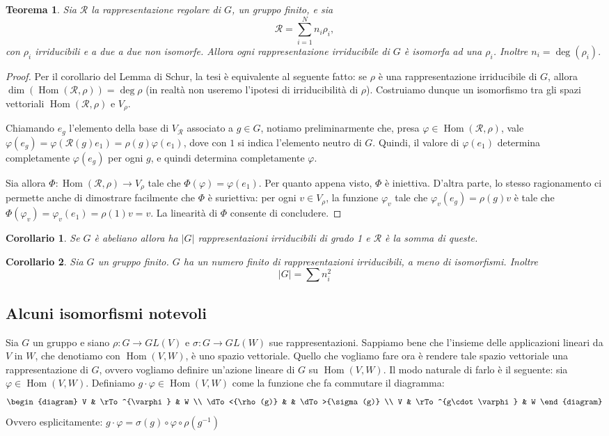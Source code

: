 \documentclass[11pt]{article}
\theoremstyle{plain}
\newtheorem{thm}{Teorema}[section]
\newtheorem*{cor}{Corollario}
\theoremstyle{definition}
\theoremstyle{remark}
\newcommand{\dsum}{\displaystyle\sum}
\DeclareMathOperator{\Hom}{Hom}
\newcommand{\quaddiag}[8]{
	\begin{diagram}
	#1     & \rTo^{#2} & #3 \\
	\dTo<{#6} &         & \dTo>{#4} \\
	#7     & \rTo^{#8} & #5
	\end{diagram}
}
\begin{document}
\begin{thm}
Sia $\mathcal{R}$ la rappresentazione regolare di $G$, un gruppo finito, e sia
\[ \mathcal{R} = \dsum_{i=1}^Nn_i \rho_i,\]
con $\rho_i$ irriducibili e a due a due non isomorfe. Allora ogni rappresentazione irriducibile di $G$ è isomorfa ad una $\rho_i$. Inoltre $n_i = \deg(\rho_i).$
\label{thm: teorema importantissimo}
\end{thm}
\begin{proof}
Per il corollario del Lemma di Schur, la tesi è equivalente al seguente fatto: se $\rho$ è una rappresentazione irriducibile di $G$, allora $\dim\left(\Hom(\mathcal{R},\rho)\right)=\deg\rho$ (in realtà non useremo l'ipotesi di irriducibilità di $\rho$). Costruiamo dunque un isomorfismo tra gli spazi vettoriali $\Hom(\mathcal{R},\rho)$ e $V_\rho$.

Chiamando $e_g$ l'elemento della base di $V_\mathcal{R}$ associato a $g\in G$, notiamo preliminarmente che, presa $\varphi\in\Hom(\mathcal{R},\rho)$, vale $\varphi(e_g)=\varphi(\mathcal{R}(g)e_{1})=\rho(g)\varphi(e_1)$, dove con $1$ si indica l'elemento neutro di $G$. Quindi, il valore di $\varphi(e_1)$ determina completamente $\varphi(e_g)$ per ogni $g$, e quindi determina completamente $\varphi$.

Sia allora $\Phi\colon\Hom(\mathcal{R},\rho)\to V_\rho$ tale che $\Phi(\varphi)=\varphi(e_{1})$. Per quanto appena visto, $\Phi$ è iniettiva. D'altra parte, lo stesso ragionamento ci permette anche di dimostrare facilmente che $\Phi$ è suriettiva: per ogni $v\in V_\rho$, la funzione $\varphi_v$ tale che $\varphi_v(e_g)=\rho(g)v$ è tale che $\Phi(\varphi_v)=\varphi_v(e_1)=\rho(1)v=v$. La linearità di $\Phi$ consente di concludere.
\end{proof}


\begin{cor}
Se $G$ è abeliano allora ha $|G|$ rappresentazioni irriducibili di grado 1 e $\mathcal{R}$ è la somma di queste.
\end{cor}


\begin{cor}
Sia $G$ un gruppo finito. $G$ ha un numero finito di rappresentazioni irriducibili, a meno di isomorfismi. Inoltre
\[|G| = \dsum n_i^2\]
\end{cor}






\newpage
\subsection{Alcuni isomorfismi notevoli}
Sia $G$ un gruppo e siano $\rho:G\to GL(V)$ e $\sigma:G\to GL(W)$ sue rappresentazioni.
Sappiamo bene che l'insieme delle applicazioni lineari da $V$ in $W$,
che denotiamo con $\Hom(V, W)$, è uno spazio vettoriale.
Quello che vogliamo fare ora è rendere tale spazio vettoriale una rappresentazione di $G$,
ovvero vogliamo definire un'azione lineare di $G$ su $\Hom(V, W)$.
Il modo naturale di farlo è il seguente:
sia $\varphi\in\Hom(V, W)$. Definiamo $g\cdot \varphi\in\Hom(V, W)$ come la funzione che fa commutare il diagramma:
\[ \quaddiag V \varphi W {\sigma(g)} W {\rho(g)} V {g\cdot \varphi} \]
Ovvero esplicitamente: $g\cdot\varphi = \sigma(g) \circ \varphi\circ \rho(g^{-1})$
\end{document}
